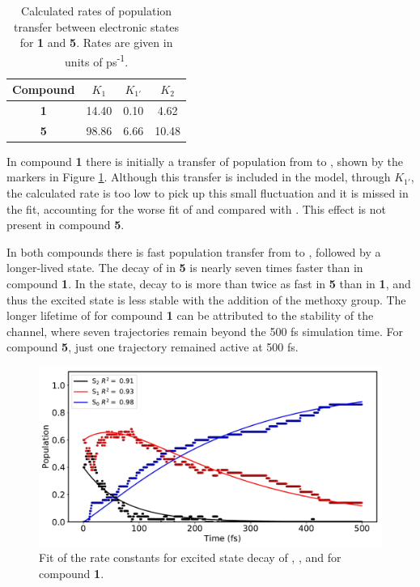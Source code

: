 \begin{table}
    \centering
    \begin{tabular}{cccc}
    \hline
    Compound & $K_{1}$ & $K_{1'}$ & $K_{2}$\\
    \hline
    \textbf{1} & 14.40 & 0.10 & 4.62\\
     \textbf{5} & 98.86 & 6.66 & 10.48\\
     \hline
    \end{tabular}
    \caption[Calculated rates of population transfer between electronic states]{Calculated rates of population transfer between electronic states for \textbf{1} and \textbf{5}. Rates are given in units of ps\textsuperscript{-1}.}
    \label{table: state_decay_rates}
\end{table}

In compound \textbf{1} there is initially a transfer of population from \sone{} to \stwo{}, shown by the markers in Figure \ref{figure: HC_1_states_dynamics_fit}. Although this transfer is included in the model, through $K_{1'}$, the calculated rate is too low to pick up this small fluctuation and it is missed in the fit, accounting for the worse fit of \stwo{} and \sone{} compared with \szero{}. This effect is not present in compound \textbf{5}. 

In both compounds there is fast population transfer from \stwo{} to \sone{}, followed by a longer-lived \sone{} state. The decay of \stwo{} in \textbf{5} is nearly seven times faster than in compound \textbf{1}. In the \sone{} state, decay to \szero{} is more than twice as fast in \textbf{5} than in \textbf{1}, and thus the excited state is less stable with the addition of the methoxy group. The longer lifetime of \sone{} for compound \textbf{1} can be attributed to the stability of the \Estar{} channel, where seven trajectories remain beyond the 500 fs simulation time. For compound \textbf{5}, just one trajectory remained active at 500 fs. 

\begin{figure}[t]
\centering
  \includegraphics[width=0.9\linewidth]{3nonradiativedecay/HC_1_states_dynamics_fit.pdf}
  \caption[Model of the state decay rates for \textbf{HC1}]{Fit of the rate constants for excited state decay of \stwo{}, \sone{}, and \szero{} for compound \textbf{1}.}
  \label{figure: HC_1_states_dynamics_fit}
\end{figure}

